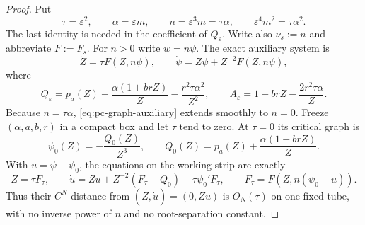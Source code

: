 \begin{proof}
Put
\[
 \tau=\varepsilon^2,\qquad \alpha=\varepsilon m,\qquad
 n=\varepsilon^3m=\tau\alpha,\qquad
 \varepsilon^4m^2=\tau\alpha^2.
\]
The last identity is needed in the coefficient of $Q_\varepsilon$.
Write also $\nu_s:=n$ and abbreviate $F:=F_s$.
For $n>0$ write $w=n\psi$.  The exact auxiliary system is
\begin{equation}\label{eq:pc-graph-auxiliary}
 \dot Z=\tau F(Z,n\psi),\qquad
 \dot\psi=Z\psi+Z^{-2}F(Z,n\psi),
\end{equation}
where
\[
 Q_\varepsilon=p_a(Z)+\frac{\alpha(1+brZ)}Z
                   -\frac{r^2\tau\alpha^2}{Z^2},\qquad
 A_\varepsilon=1+brZ-\frac{2r^2\tau\alpha}{Z}.
\]
Because $n=\tau\alpha$, \eqref{eq:pc-graph-auxiliary} extends smoothly
to $n=0$.  Freeze $(\alpha,a,b,r)$ in a compact box and let $\tau$ tend
to zero.  At $\tau=0$ its critical graph is
\[
 \psi_0(Z)=-\frac{Q_0(Z)}{Z^3},\qquad
 Q_0(Z)=p_a(Z)+\frac{\alpha(1+brZ)}Z.
\]
With $u=\psi-\psi_0$, the equations on the working strip are exactly
\begin{equation}\label{eq:pc-graph-auxiliary-shift}
 \dot Z=\tau F_\tau,\qquad
 \dot u=Zu+Z^{-2}(F_\tau-Q_0)-\tau\psi_0'F_\tau,\qquad
 F_\tau=F(Z,n(\psi_0+u)).
\end{equation}
Thus their $C^N$ distance from $(\dot Z,\dot u)=(0,Zu)$ is
$O_N(\tau)$ on one fixed tube, with no inverse power of $n$ and no
root-separation constant.


\end{proof}
